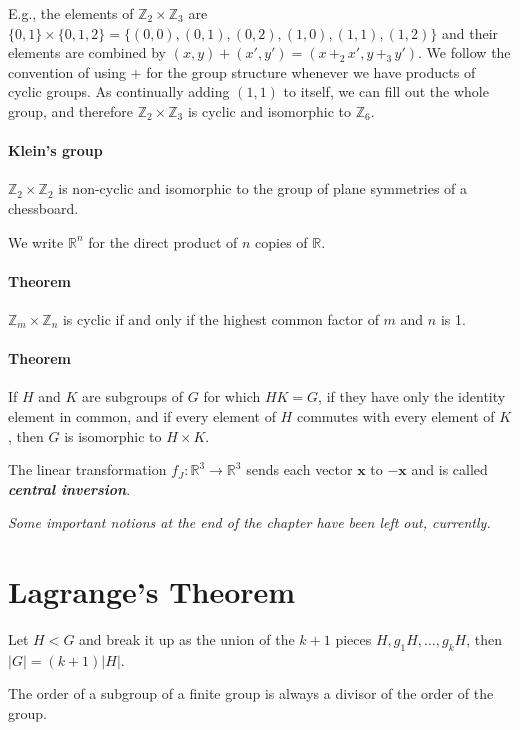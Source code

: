 \documentclass[a4paper,twocolumn,10pt]{article}
\begin{document}
  E.g., the elements of $\mathbb{Z}_2 \times \mathbb{Z}_3$ are
  $\{0,1\}\times\{0,1,2\} = \{(0,0), (0,1), (0,2), (1,0), (1,1), (1,2)\}$ and
  their elements are combined by $(x,y) + (x',y') = (x \,+_2\, x', y \,+_3\, y')$.
  We follow the convention of using $+$ for the group structure whenever we
  have products of cyclic groups. As continually adding $(1,1)$ to itself, we
  can fill out the whole group, and therefore $\mathbb{Z}_2 \times
  \mathbb{Z}_3$ is cyclic and isomorphic to $\mathbb{Z}_6$.

  \paragraph{Klein's group} $\mathbb{Z}_2 \times \mathbb{Z}_2$ is non-cyclic
  and isomorphic to the group of plane symmetries of a chessboard.

  We write $\mathbb{R}^n$ for the direct product of $n$ copies of $\mathbb{R}$.

  \paragraph{Theorem } $\mathbb{Z}_m \times \mathbb{Z}_n$ is
  cyclic if and only if the highest common factor of $m$ and $n$ is 1.

  \paragraph{Theorem } If $H$ and $K$ are subgroups of $G$ for
  which $HK=G$, if they have only the identity element in common, and if every
  element of $H$ commutes with every element of $K$, then $G$ is isomorphic to
  $H \times K$.

  The linear transformation $f_J\colon \mathbb{R}^3 \rightarrow \mathbb{R}^3$
  sends each vector $\bm{x}$ to $\bm{-x}$ and is called
  \textbf{\textit{central inversion}}.

  \textit{Some important notions at the end of the chapter have been left out,
  currently.}

  \section{Lagrange's Theorem}
  Let $H<G$ and break it up as the union of the $k+1$ pieces $H, g_1H, \ldots,
  g_kH$, then $|G|=(k+1)|H|$.

   The order of a subgroup of a finite group is always a divisor
  of the order of the group.
\end{document}
